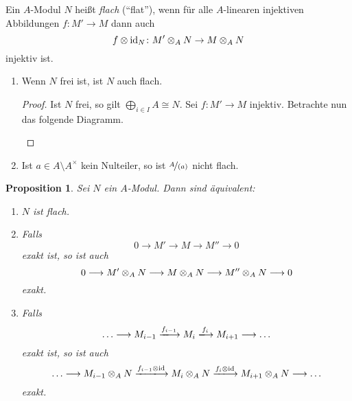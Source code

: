 \documentclass[12pt,a4paper]{scrartcl}
\theoremstyle{cplain}
\newtheorem{prop}[thmcounter]{Proposition}
\theoremstyle{cdef}
\begin{document}
\begin{defi}
	Ein $A$-Modul $N$ heißt \emph{flach} (\enquote{flat}), wenn für alle $A$-linearen injektiven Abbildungen $f: M' \to M$ dann auch \[ f \otimes \operatorname{id}_N \colon M' \otimes_A N \to M \otimes_A N \] injektiv ist.
\end{defi}
\begin{bsp}
	\leavevmode
	\begin{enumerate}
		\item Wenn $N$ frei ist, ist $N$ auch flach.
		\begin{proof}
			Ist $N$ frei, so gilt $\bigoplus_{i \in I} A \cong N$. Sei $f\colon M' \to M$ injektiv. Betrachte nun das folgende Diagramm.
			\begin{center}
			\end{center}
		\end{proof}
		\item Ist $a \in A \setminus A^{\times}$ kein Nulteiler, so ist $\nicefrac{A}{(a)}$ nicht flach.
	\end{enumerate}
\end{bsp}
\begin{prop}
	Sei $N$ ein $A$-Modul. Dann sind äquivalent:
	\begin{enumerate}
		\item $N$ ist flach. \label{prop:flach:i}
		\item Falls \[ 0 \longrightarrow M' \longrightarrow M \longrightarrow M'' \longrightarrow 0 \] exakt ist, so ist auch \[ 0 \longrightarrow M' \otimes_A N \longrightarrow M \otimes_A N \longrightarrow M'' \otimes_A N \longrightarrow 0 \] exakt. \label{prop:flach:ii}
		\item Falls \[ \ldots \longrightarrow M_{i-1} \xlongrightarrow{f_{i-1}} M_i \xlongrightarrow{f_{i}} M_{i+1} \longrightarrow \ldots \] exakt ist, so ist auch \[ \ldots \longrightarrow M_{i-1}\tp_A N \xlongrightarrow{f_{i-1}\tp\id} M_i\tp_A N \xlongrightarrow{f_{i}\tp\id} M_{i+1}\tp_A N \longrightarrow \ldots \] exakt. \label{prop:flach:iii}
	\end{enumerate}
\end{prop}
\end{document}
